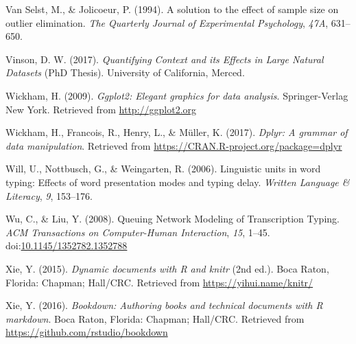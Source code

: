 \documentclass[floatsintext,man]{apa6}
\theoremstyle{definition}
\theoremstyle{definition}
\theoremstyle{definition}
\theoremstyle{remark}
\begin{document}
\hypertarget{ref-van_selst_solution_1994}{}
Van Selst, M., \& Jolicoeur, P. (1994). A solution to the effect of
sample size on outlier elimination. \emph{The Quarterly Journal of
Experimental Psychology}, \emph{47A}, 631--650.

\hypertarget{ref-vinson_quantifying_2017}{}
Vinson, D. W. (2017). \emph{Quantifying Context and its Effects in Large
Natural Datasets} (PhD Thesis). University of California, Merced.

\hypertarget{ref-R-ggplot2}{}
Wickham, H. (2009). \emph{Ggplot2: Elegant graphics for data analysis}.
Springer-Verlag New York. Retrieved from \url{http://ggplot2.org}

\hypertarget{ref-R-dplyr}{}
Wickham, H., Francois, R., Henry, L., \& Müller, K. (2017). \emph{Dplyr:
A grammar of data manipulation}. Retrieved from
\url{https://CRAN.R-project.org/package=dplyr}

\hypertarget{ref-will_linguistic_2006}{}
Will, U., Nottbusch, G., \& Weingarten, R. (2006). Linguistic units in
word typing: Effects of word presentation modes and typing delay.
\emph{Written Language \& Literacy}, \emph{9}, 153--176.

\hypertarget{ref-wu_queuing_2008}{}
Wu, C., \& Liu, Y. (2008). Queuing Network Modeling of Transcription
Typing. \emph{ACM Transactions on Computer-Human Interaction},
\emph{15}, 1--45.
doi:\href{https://doi.org/10.1145/1352782.1352788}{10.1145/1352782.1352788}

\hypertarget{ref-R-knitr}{}
Xie, Y. (2015). \emph{Dynamic documents with R and knitr} (2nd ed.).
Boca Raton, Florida: Chapman; Hall/CRC. Retrieved from
\url{https://yihui.name/knitr/}

\hypertarget{ref-R-bookdown}{}
Xie, Y. (2016). \emph{Bookdown: Authoring books and technical documents
with R markdown}. Boca Raton, Florida: Chapman; Hall/CRC. Retrieved from
\url{https://github.com/rstudio/bookdown}

\endgroup
\end{document}
